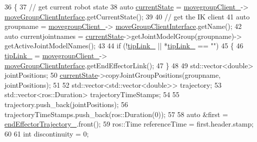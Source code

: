 \begin{DoxyCode}
36     \{
37         \textcolor{comment}{// get current robot state}
38         \textcolor{keyword}{auto} \hyperlink{classsmacc_1_1ISmaccClientBehavior_a5a6658a2deb72b700ae595e594617616}{currentState} = \hyperlink{classcl__move__group__interface_1_1CbMoveEndEffectorTrajectory_aea650d3e7836125b32be97392b71a7f3}{movegroupClient\_}->
      \hyperlink{classcl__move__group__interface_1_1ClMoveGroup_a92922ea689e4e1b7b91512c56629c95b}{moveGroupClientInterface}.getCurrentState();
39 
40         \textcolor{comment}{// get the IK client}
41         \textcolor{keyword}{auto} groupname = \hyperlink{classcl__move__group__interface_1_1CbMoveEndEffectorTrajectory_aea650d3e7836125b32be97392b71a7f3}{movegroupClient\_}->
      \hyperlink{classcl__move__group__interface_1_1ClMoveGroup_a92922ea689e4e1b7b91512c56629c95b}{moveGroupClientInterface}.getName();
42         \textcolor{keyword}{auto} currentjointnames = \hyperlink{classsmacc_1_1ISmaccClientBehavior_a5a6658a2deb72b700ae595e594617616}{currentState}->getJointModelGroup(groupname)->
      getActiveJointModelNames();
43 
44         \textcolor{keywordflow}{if} (!\hyperlink{classcl__move__group__interface_1_1CbMoveEndEffectorTrajectory_a24c6c30b9b0761a61fa002d947bd3e11}{tipLink\_} || *\hyperlink{classcl__move__group__interface_1_1CbMoveEndEffectorTrajectory_a24c6c30b9b0761a61fa002d947bd3e11}{tipLink\_} == \textcolor{stringliteral}{""})
45         \{
46             \hyperlink{classcl__move__group__interface_1_1CbMoveEndEffectorTrajectory_a24c6c30b9b0761a61fa002d947bd3e11}{tipLink\_} = \hyperlink{classcl__move__group__interface_1_1CbMoveEndEffectorTrajectory_aea650d3e7836125b32be97392b71a7f3}{movegroupClient\_}->
      \hyperlink{classcl__move__group__interface_1_1ClMoveGroup_a92922ea689e4e1b7b91512c56629c95b}{moveGroupClientInterface}.getEndEffectorLink();
47         \}
48 
49         std::vector<double> jointPositions;
50         \hyperlink{classsmacc_1_1ISmaccClientBehavior_a5a6658a2deb72b700ae595e594617616}{currentState}->copyJointGroupPositions(groupname, jointPositions);
51 
52         std::vector<std::vector<double>> trajectory;
53         std::vector<ros::Duration> trajectoryTimeStamps;
54 
55         trajectory.push\_back(jointPositions);
56         trajectoryTimeStamps.push\_back(ros::Duration(0));
57 
58         \textcolor{keyword}{auto} &first = \hyperlink{classcl__move__group__interface_1_1CbMoveEndEffectorTrajectory_ae13dfd31ea3660646e03882f0c2c29f0}{endEffectorTrajectory\_}.front();
59         ros::Time referenceTime = first.header.stamp;
60 
61         \textcolor{keywordtype}{int} discontinuity = 0;

\end{DoxyCode}
